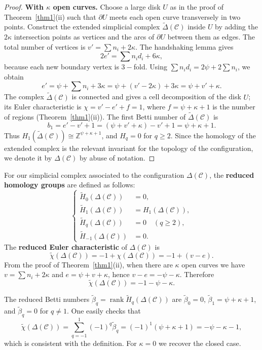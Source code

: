 \documentclass[article,11pt]{amsart} \numberwithin{equation}{section}
\numberwithin{equation}{section}
\begin{document}
{\begin{proof}
	\textbf{With $\kappa$ open curves.} 
	Choose a large disk $U$ as in the proof of Theorem~\ref{thm1}(ii) such that $\partial U$ meets each open curve transversely in two points. Construct the extended simplicial complex $\widetilde{\Delta}(\mathcal{C})$ inside $U$ by adding the $2\kappa$ intersection points as vertices and the arcs of $\partial U$ between them as edges. The total number of vertices is $v' = \sum n_i + 2\kappa$. The handshaking lemma gives
	\[
	2e' = \sum n_i d_i + 6\kappa,
	\]
	because each new boundary vertex is $3-$fold. Using $\sum n_i d_i = 2\psi + 2\sum n_i$, we obtain
	\[
	e' = \psi + \sum n_i + 3\kappa = \psi + (v'-2\kappa) + 3\kappa = \psi + v' + \kappa.
	\]
	The complex $\widetilde{\Delta}(\mathcal{C})$ is connected and gives a cell decomposition of the disk $U$; its Euler characteristic is $\chi = v' - e' + f = 1$, where $f = \psi+\kappa+1$ is the number of regions (Theorem~\ref{thm1}(ii)). The first Betti number of $\widetilde{\Delta}(\mathcal{C})$ is
	\[
	b_1 = e' - v' + 1 = (\psi + v' + \kappa) - v' + 1 = \psi + \kappa + 1.
	\]
	Thus $H_1(\widetilde{\Delta}(\mathcal{C})) \cong \mathbb{Z}^{\psi+\kappa+1}$, and $H_q=0$ for $q\ge 2$. Since the homology of the extended complex is the relevant invariant for the topology of the configuration, we denote it by $\Delta(\mathcal{C})$ by abuse of notation.
\end{proof}

For our simplicial complex associated to the configuration $\Delta(\mathcal{C})$, the \textbf{reduced homology groups} are defined as follows:
\[
\left\{
\begin{aligned}
	\tilde H_0(\Delta(\mathcal{C})) &= 0,\\
	\tilde H_1(\Delta(\mathcal{C})) &= H_1(\Delta(\mathcal{C})),\\
	\tilde H_q(\Delta(\mathcal{C})) &= 0 \quad (q\ge 2),\\
	\tilde H_{-1}(\Delta(\mathcal{C})) &= 0.
\end{aligned}
\right.
\]
The \textbf{reduced Euler characteristic} of $\Delta(\mathcal{C})$ is
\[
\tilde\chi(\Delta(\mathcal{C})) = -1 + \chi(\Delta(\mathcal{C}))
= -1 + (v - e).
\]
From the proof of Theorem~\ref{thm1}(ii), when there are $\kappa$ open curves we have $v = \sum n_i + 2\kappa$ and $e = \psi + v + \kappa$, hence $v - e = -\psi - \kappa$. Therefore
\[
\tilde\chi(\Delta(\mathcal{C})) = -1 - \psi - \kappa.
\]

The reduced Betti numbers $\tilde\beta_q = \operatorname{rank}\tilde H_q(\Delta(\mathcal{C}))$ are $\tilde\beta_0=0$, $\tilde\beta_1 = \psi+\kappa+1$, and $\tilde\beta_q=0$ for $q\ne 1$. One easily checks that
\[
\tilde\chi(\Delta(\mathcal{C})) = \sum_{q=-1}^{1} (-1)^q \tilde\beta_q = (-1)^1(\psi+\kappa+1) = -\psi-\kappa-1,
\]
which is consistent with the definition. For $\kappa=0$ we recover the closed case.

}
\end{document}
